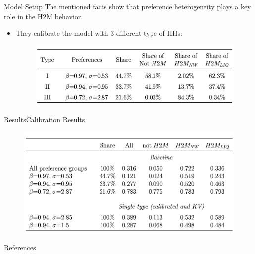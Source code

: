 \documentclass{beamer}
\begin{document}
\begin{frame}{Model Setup}
	The mentioned facts show that preference heterogeneity plays a key role in the H2M behavior.
	\begin{itemize}
		\item <1-> They calibrate the model with 3 different type of HHs:
		\begin{figure}
			\centering
			\includegraphics[width=0.7\linewidth]{Figures/Table10.png}
		\end{figure}
	\end{itemize}
\end{frame}
\begin{frame}{Results}{Calibration Results}
	\label{table13}
	\begin{figure}
		\centering
		\includegraphics[width=0.85\linewidth]{Figures/Table13.png}
	\end{figure}
\end{frame}



\scriptsize 
	\begin{frame}[allowframebreaks]{References}
			

		
	\end{frame}
	
	\normalsize
\end{document}
